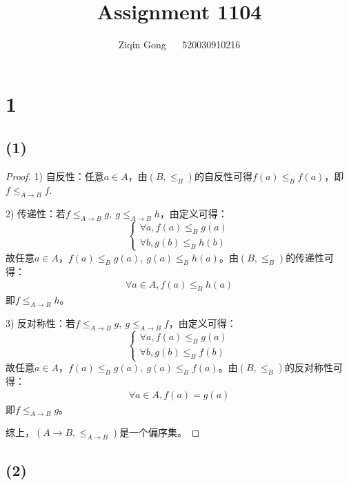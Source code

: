 \documentclass[12pt]{article}
\title{Assignment 1104}
\author{Ziqin Gong $\quad$ 520030910216}
\date{}
\newcommand{\leqab}{\leq_{A \to B}}
\newcommand{\leqb}{\leq_B}
\begin{document}
  \maketitle

  \section*{1}

    \subsection*{(1)}

      \begin{proof}
        1) 自反性：任意$a\in A$，由$(B,\leqb)$的自反性可得$f(a)\leqb f(a)$，即$f\leqab f$.

        2) 传递性：若$f \leqab g,\ g \leqab h$，由定义可得：
           \begin{equation}
           \begin{cases}
             \forall a, f(a) \leqb g(a) \\
             \forall b, g(b) \leqb h(b)
           \end{cases}
           \end{equation}
           故任意$a \in A$，$f(a) \leqb g(a),\ g(a) \leqb h(a)$。由$(B,\leqb)$的传递性可得：
           \begin{gather}
             \forall a \in A, f(a) \leqb h(a)
           \end{gather}
           即$f \leqab h$。

        3) 反对称性：若$f \leqab g,\ g \leqab f$，由定义可得：
           \begin{equation}
           \begin{cases}
             \forall a, f(a) \leqb g(a) \\
             \forall b, g(b) \leqb f(b)
           \end{cases}
           \end{equation}
           故任意$a \in A$，$f(a) \leqb g(a),\ g(a) \leqb f(a)$。由$(B,\leqb)$的反对称性可得：
           \begin{gather}
             \forall a \in A, f(a) = g(a)
           \end{gather}
           即$f \leqab g$。

        综上，$(A \to B, \leqab)$是一个偏序集。
    \end{proof}

  \subsection*{(2)}
\end{document}
